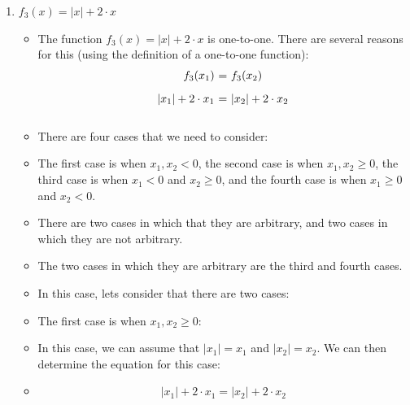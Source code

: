\documentclass[12pt]{report}
\begin{document}
\begin{enumerate}[leftmargin=\labelsep]
\begin{enumerate}
\newpage
            \item $f_3(x)=|x|+2 \cdot x$
                \begin{tcolorbox}
                    \begin{itemize}[label={}]
                        \item The function $f_3(x)=|x|+2 \cdot x$ is one-to-one. There are several reasons for this (using the definition of a one-to-one function):
                        \begin{equation*}
                            \begin{array}{r@{~=~}l}
                                f_3(x_1) & f_3(x_2) \\ [2ex]
                                |x_1|+2 \cdot x_1 & |x_2|+2 \cdot x_2 \\ [2ex]
                            \end{array}
                        \end{equation*}
                        \item There are four cases that we need to consider:
                        \item The first case is when $x_1,x_2 < 0$, the second case is when $x_1,x_2 \geq 0$, the third case is when $x_1 < 0$ and $x_2 \geq 0$, and the fourth case is when $x_1 \geq 0$ and $x_2 < 0$.
                        \item There are two cases in which that they are arbitrary, and two cases in which they are not arbitrary. 
                        \item The two cases in which they are arbitrary are the third and fourth cases.
                        \item In this case, lets consider that there are two cases:
                        \item The first case is when $x_1,x_2 \geq 0$:
                        \item In this case, we can assume that $|x_1|=x_1$ and $|x_2|=x_2$. We can then determine the equation for this case:
                    \end{itemize}
                \end{tcolorbox}
                \begin{tcolorbox}
                    \begin{itemize}[label={}]
                        \item
                        \begin{equation*}
                            |x_1|+2 \cdot x_1 = |x_2|+2 \cdot x_2

\end{equation*}
\end{itemize}
\end{tcolorbox}
\end{enumerate}
\end{enumerate}
\end{document}

